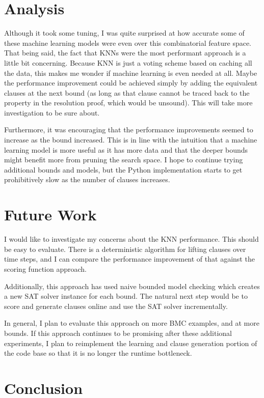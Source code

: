 \documentclass[letterpaper]{article} %
\begin{document}
\section{Analysis}

Although it took some tuning, I was quite surprised at how accurate some of these machine learning models were even over this combinatorial feature space. That being said, the fact that KNNs were the most performant approach is a little bit concerning. Because KNN is just a voting scheme based on caching all the data, this makes me wonder if machine learning is even needed at all. Maybe the performance improvement could be achieved simply by adding the equivalent clauses at the next bound (as long as that clause cannot be traced back to the property in the resolution proof, which would be unsound). This will take more investigation to be sure about.

Furthermore, it was encouraging that the performance improvements seemed to increase as the bound increased. This is in line with the intuition that a machine learning model is more useful as it has more data and that the deeper bounds might benefit more from pruning the search space. I hope to continue trying additional bounds and models, but the Python implementation starts to get prohibitively slow as the number of clauses increases.

\section{Future Work}

I would like to investigate my concerns about the KNN performance. This should be easy to evaluate. There is a deterministic algorithm for lifting clauses over time steps, and I can compare the performance improvement of that against the scoring function approach.

Additionally, this approach has used naive bounded model checking which creates a new SAT solver instance for each bound. The natural next step would be to score and generate clauses online and use the SAT solver incrementally.

In general, I plan to evaluate this approach on more BMC examples, and at more bounds. If this approach continues to be promising after these additional experiments, I
plan to reimplement the learning and clause generation portion of the code base so that it is no longer the runtime bottleneck.

\section{Conclusion}
\end{document}
